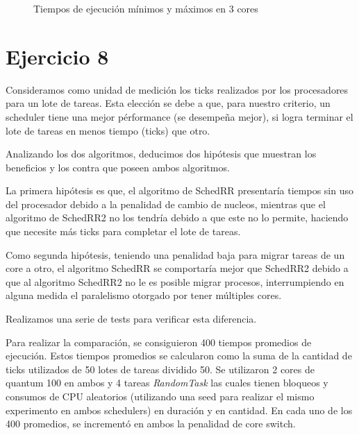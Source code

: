 \documentclass[a4paper,10pt,twoside]{article}
\begin{document}
\begin{figure}[H]
	\centering
	
	\caption{Tiempos de ejecución mínimos y máximos en 3 cores}
\end{figure}





\section{Ejercicio 8}

Consideramos como unidad de medición los ticks realizados por los procesadores para un lote de tareas. Esta elección se debe a que, para nuestro criterio, un scheduler tiene una mejor pérformance (se desempeña mejor), si logra terminar el lote de tareas en menos tiempo (ticks) que otro.

Analizando los dos algoritmos, deducimos dos hipótesis que muestran los beneficios y los contra que poseen ambos algoritmos.

La primera hipótesis es que, el algoritmo de SchedRR presentaría tiempos sin uso del procesador debido a la penalidad de cambio de nucleos, mientras que el algoritmo de SchedRR2 no los tendría debido a que este no lo permite, haciendo que necesite más ticks para completar el lote de tareas.

Como segunda hipótesis, teniendo una penalidad baja para migrar tareas de un core a otro,  el algoritmo SchedRR se comportaría mejor que SchedRR2 debido a que al algoritmo SchedRR2 no le es posible migrar procesos, interrumpiendo en alguna medida el paralelismo otorgado por tener múltiples cores.

Realizamos una serie de tests para verificar esta diferencia.

Para realizar la comparación, se consiguieron 400 tiempos promedios de ejecución. Estos tiempos promedios se calcularon como la suma de la cantidad de ticks utilizados de 50 lotes de tareas dividido 50. Se utilizaron 2 cores de quantum 100 en ambos y 4 tareas \textit{RandomTask} las cuales tienen bloqueos y consumos de CPU aleatorios (utilizando una seed para realizar el mismo experimento en ambos schedulers) en duración y en cantidad. En cada uno de los 400 promedios, se incrementó en ambos la penalidad de core switch.
\end{document}

